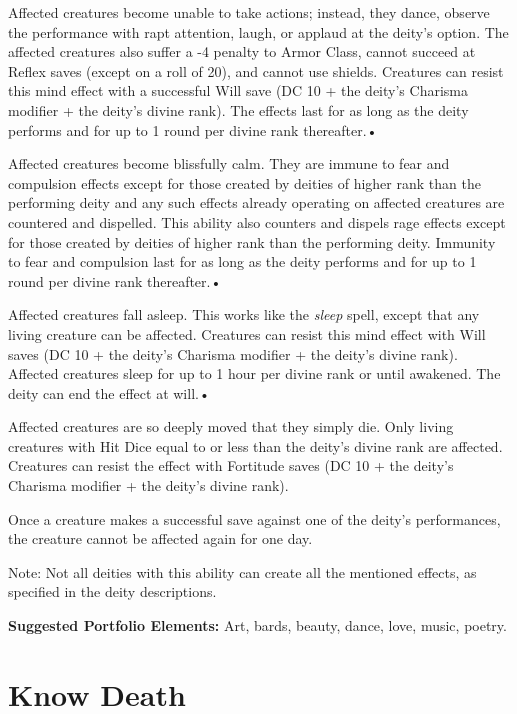 \documentclass{article}
\begin{document}
\parindent=3pt
Affected creatures become unable to take actions; instead, they dance, observe 
the performance with rapt attention, laugh, or applaud at the deity's option. The 
affected creatures also suffer a -4 penalty to Armor Class, cannot succeed at Reflex 
saves (except on a roll of 20), and cannot use shields. Creatures can resist this 
mind effect with a successful Will save (DC 10 + the deity's Charisma modifier 
+ the deity's divine rank). The effects last for as long as the deity performs 
and for up to 1 round per divine rank thereafter.• 

Affected creatures become blissfully calm. They are immune to fear and compulsion 
effects except for those created by deities of higher rank than the performing 
deity and any such effects already operating on affected creatures are countered 
and dispelled. This ability also counters and dispels rage effects except for those 
created by deities of higher rank than the performing deity. Immunity to fear and 
compulsion last for as long as the deity performs and for up to 1 round per divine 
rank thereafter.• 

\parindent=7pt
Affected creatures fall asleep. This works like the \textit{sleep }spell, except 
that any living creature can be affected. Creatures can resist this mind effect 
with Will saves (DC 10 + the deity's Charisma modifier + the deity's divine rank). 
Affected creatures sleep for up to 1 hour per divine rank or until awakened. The 
deity can end the effect at will.• 

\parindent=3pt
Affected creatures are so deeply moved that they simply die. Only living creatures 
with Hit Dice equal to or less than the deity's divine rank are affected. Creatures 
can resist the effect with Fortitude saves (DC 10 + the deity's Charisma modifier 
+ the deity's divine rank).

\parindent=0pt
Once a creature makes a successful save against one of the deity's performances, 
the creature cannot be affected again for one day.

Note: Not all deities with this ability can create all the mentioned effects, as 
specified in the deity descriptions.

\textbf{Suggested Portfolio Elements:} Art, bards, beauty, dance, love, music, 
poetry.

\vspace{12pt}
\section*{Know Death}
\end{document}
